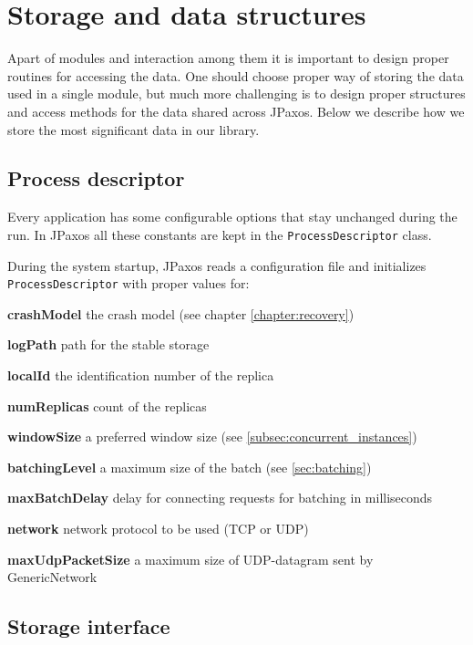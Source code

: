 \section{Storage and data structures}
\label{sec:storage_and_data_structures}

Apart of modules and interaction among them it is important to design proper routines for accessing the data.
One should choose proper way of storing the data used in a single module, but much more challenging is to design proper structures and access methods for the data shared across JPaxos. Below we describe how we store the most significant data in our library.

\subsection{Process descriptor}

Every application has some configurable options that stay unchanged during the run. In JPaxos all these constants are kept in the \texttt{ProcessDescriptor} class.

During the system startup, JPaxos reads a configuration file and initializes \texttt{Pro\-cess\-De\-scrip\-tor} with proper values for:
\begin{tightList}[\setlength{\labelwidth}{0em}]
 \item[\textbf{crashModel}] the crash model (see chapter \ref{chapter:recovery})
 \item[\textbf{logPath}] path for the stable storage
 \item[\textbf{localId}] the identification number of the replica
 \item[\textbf{numReplicas}] count of the replicas
 \item[\textbf{windowSize}] a preferred window size (see \ref{subsec:concurrent_instances})
 \item[\textbf{batchingLevel}] a maximum size of the batch (see \ref{sec:batching})
 \item[\textbf{maxBatchDelay}] delay for connecting requests for batching in milliseconds
 \item[\textbf{network}] network protocol to be used (TCP or UDP)
 \item[\textbf{maxUdpPacketSize}] a maximum size of UDP-datagram sent by GenericNetwork
\end{tightList}

\subsection{Storage interface}
\label{subsec:storage_interface}

